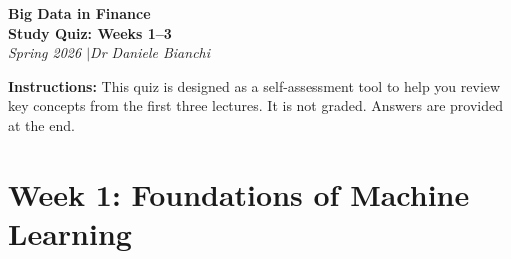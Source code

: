 \documentclass[11pt]{article}
\begin{document}
\begin{center}
  {\LARGE\bfseries\color{ThemeBlue} Big Data in Finance}\\[0.5em]
  {\Large\bfseries Study Quiz: Weeks 1--3}\\[0.3em]
  {\large\itshape Spring 2026 \quad$\mid$\quad Dr Daniele Bianchi}
\end{center}

\vspace{1em}

\noindent\textbf{Instructions:} This quiz is designed as a self-assessment tool to help you review key concepts from the first three lectures. It is not graded. Answers are provided at the end.

\vspace{1.5em}

\section*{Week 1: Foundations of Machine Learning}
\end{document}
